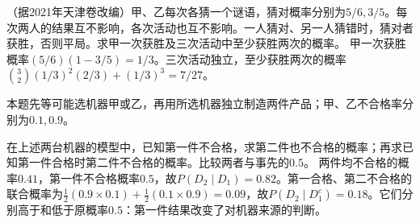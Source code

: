（据2021年天津卷改编）甲、乙每次各猜一个谜语，猜对概率分别为\(5/6,3/5\)。每次两人的结果互不影响，各次活动也互不影响。一人猜对、另一人猜错时，猜对者获胜，否则平局。求甲一次获胜及三次活动中至少获胜两次的概率。
\solutionanswer
甲一次获胜概率\((5/6)(1-3/5)=1/3\)。三次活动独立，至少获胜两次的概率\(\binom32(1/3)^2(2/3)+(1/3)^3=7/27\)。


本题先等可能选机器甲或乙，再用所选机器独立制造两件产品；甲、乙不合格率分别为\(0.1,0.9\)。

在上述两台机器的模型中，已知第一件不合格，求第二件也不合格的概率；再求已知第一件合格时第二件不合格的概率。比较两者与事先的\(0.5\)。
\solutionanswer
两件均不合格的概率\(0.41\)，第一件不合格概率\(0.5\)，故\(P(D_2\mid D_1)=0.82\)。第一合格、第二不合格的联合概率为\(\frac12(0.9\times0.1)+\frac12(0.1\times0.9)=0.09\)，故\(P(D_2\mid D_1^c)=0.18\)。它们分别高于和低于原概率\(0.5\)：第一件结果改变了对机器来源的判断。
\par
